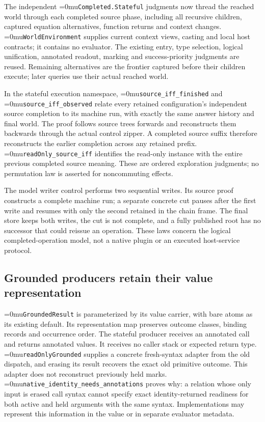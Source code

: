 \documentclass[11pt,a4paper]{article}
\newcommand{\name}[1]{\textup{\Urlmuskip=0mu\relax\nolinkurl{#1}}}
\begin{document}
The independent \name{Completed.Stateful} judgments now thread the reached
world through each completed source phase, including all recursive children,
captured equation alternatives, function returns and context changes.
\name{WorldEnvironment} supplies current context views, casting and local
host contracts; it contains no evaluator. The existing entry, type selection,
logical unification, annotated readout, marking and success-priority judgments
are reused. Remaining alternatives are the frontier captured before their
children execute; later queries use their actual reached world.

In the stateful execution namespace, \name{source_iff_finished} and
\name{source_iff_observed} relate every retained configuration's independent
source completion to its machine run, with exactly the same answer history
and final world. The proof follows source trees forwards and reconstructs
them backwards through the actual control zipper. A completed source suffix
therefore reconstructs the earlier completion across any retained prefix.
\name{readOnly_source_iff} identifies the read-only instance with the entire
previous completed source meaning. These are ordered exploration judgments;
no permutation law is asserted for noncommuting effects.

The model writer control performs two sequential writes. Its source proof
constructs a complete machine run; a separate concrete cut pauses after the
first write and resumes with only the second retained in the chain frame.
The final store keeps both writes, the cut is not complete, and a fully
published root has no successor that could reissue an operation. These laws
concern the logical completed-operation model, not a native plugin or an
executed host-service protocol.

\subsection*{Grounded producers retain their value representation}

\name{GroundedResult} is parameterized by its value carrier, with bare atoms
as its existing default. Its representation map preserves outcome classes,
binding records and occurrence order. The stateful producer receives an
annotated call and returns annotated values. It receives no caller stack or
expected return type. \name{readOnlyGrounded} supplies a concrete fresh-syntax
adapter from the old dispatch, and erasing its result recovers the exact old
primitive outcome. This adapter does not reconstruct previously held marks.
\name{native_identity_needs_annotations} proves why: a relation whose only
input is erased call syntax cannot specify exact identity-returned readiness
for both active and held arguments with the same syntax. Implementations may
represent this information in the value or in separate evaluator metadata.
\end{document}
